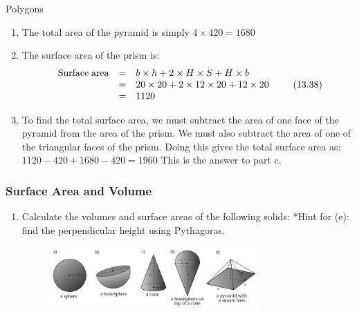 \begin{exercises}{Polygons}
{\begin{mdframed}[linewidth=4, leftmargin=40, rightmargin=40]
\begin{exercise}
\begin{enumerate}[noitemsep, label=\textbf{Step} \textbf{\arabic*}. ]
This is the answer to part b.
\item The total area of the pyramid is simply $4\ensuremath{\times}420=1680$\item The surface area of the prism is:
\label{m39357*id69663}\nopagebreak\noindent{}
    \begin{equation}
    \begin{array}{ccc}\mathrm{Surface\; area}& =& b\ensuremath{\times}h+2\ensuremath{\times}H\ensuremath{\times}S+H\ensuremath{\times}b\hfill \\ & =& \mathrm{20}\ensuremath{\times}\mathrm{20}+2\ensuremath{\times}\mathrm{12}\ensuremath{\times}\mathrm{20}+\mathrm{12}\ensuremath{\times}\mathrm{20}\hfill \\ & =& 1120\hfill \end{array}\tag{13.38}
      \end{equation}
    

\item To find the total surface area, we must subtract the area of one face of the pyramid from the area of the prism. We must also subtract the area of one of the triangular faces of the prism. Doing this gives the total surface area as:
$1120-420+1680-420=1960$ This is the answer to part c.\end{enumerate}
        


    \end{exercise}
    \end{mdframed}
    }
    \noindent
  \label{m39357*secfhsst!!!underscore!!!id508}
            \subsubsection{  Surface Area and Volume }
            \nopagebreak
            
      \label{m39357*id63805}\begin{enumerate}[noitemsep, label=\textbf{\arabic*}. ] 
            \label{m39357*uid7654}\item Calculate the volumes and surface areas of the following solids: *Hint for (e): find the perpendicular height using Pythagoras.

    \setcounter{subfigure}{0}


	\begin{figure}[H] %
    \begin{center}
    \label{m39357*id63823!!!underscore!!!media}\label{m39357*id63823!!!underscore!!!printimage}\includegraphics[width=300px]{col11306.imgs/m39357_MG11C16_005.png} %
        

\end{center}
\end{figure}
\end{enumerate}
\end{exercises}
